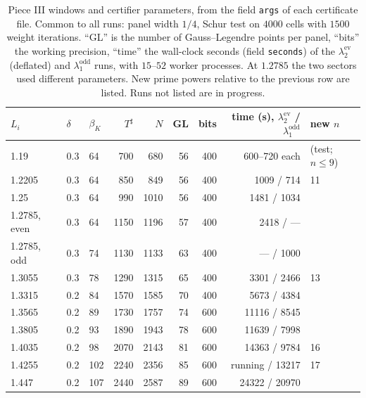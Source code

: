 \documentclass[11pt]{amsart}
\newcommand{\ev}{\mathrm{ev}}
\newcommand{\od}{\mathrm{odd}}
\newcommand{\Tsh}{T^{\sharp}}
\theoremstyle{definition}
\theoremstyle{remark}
\numberwithin{equation}{section}
\begin{document}
\begin{table}[ht]
\centering\footnotesize
\caption{Piece III windows and certifier parameters, from the field \texttt{args} of each certificate file. Common to all runs: panel width $1/4$, Schur test on $4000$ cells with $1500$ weight iterations. ``GL'' is the number of Gauss--Legendre points per panel, ``bits'' the working precision, ``time'' the wall-clock seconds (field \texttt{seconds}) of the $\lambda_2^\ev$ (deflated) and $\lambda_1^\od$ runs, with $15$--$52$ worker processes. At $1.2785$ the two sectors used different parameters. New prime powers relative to the previous row are listed. Runs not listed are in progress.}\label{tab:grid3}
\begin{tabular}{lllrrrrrl}
\toprule
$L_i$ & $\delta$ & $\beta_K$ & $\Tsh$ & $N$ & GL & bits & time (s), $\lambda_2^\ev$ / $\lambda_1^\od$ & new $n$\\
\midrule
1.19 & 0.3 & 64 & 700 & 680 & 56 & 400 & 600--720 each & (test; $n\le 9$)\\
1.2205 & 0.3 & 64 & 850 & 849 & 56 & 400 & 1009 / 714 & 11\\
1.25 & 0.3 & 64 & 990 & 1010 & 56 & 400 & 1481 / 1034 & \\
1.2785, even & 0.3 & 64 & 1150 & 1196 & 57 & 400 & 2418 / --- & \\
1.2785, odd & 0.3 & 74 & 1130 & 1133 & 63 & 400 & --- / 1000 & \\
1.3055 & 0.3 & 78 & 1290 & 1315 & 65 & 400 & 3301 / 2466 & 13\\
1.3315 & 0.2 & 84 & 1570 & 1585 & 70 & 400 & 5673 / 4384 & \\
1.3565 & 0.2 & 89 & 1730 & 1757 & 74 & 600 & 11116 / 8545 & \\
1.3805 & 0.2 & 93 & 1890 & 1943 & 78 & 600 & 11639 / 7998 & \\
1.4035 & 0.2 & 98 & 2070 & 2143 & 81 & 600 & 14363 / 9784 & 16\\
\midrule
1.4255 & 0.2 & 102 & 2240 & 2356 & 85 & 600 & running / 13217 & 17\\
1.447 & 0.2 & 107 & 2440 & 2587 & 89 & 600 & 24322 / 20970 & \\
\bottomrule
\end{tabular}
\end{table}
\end{document}
